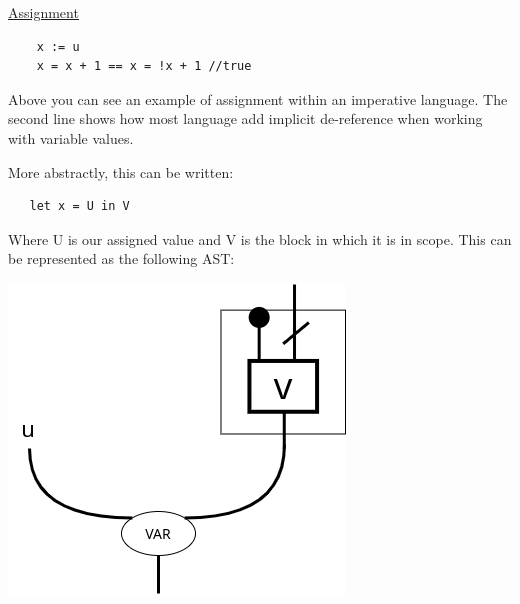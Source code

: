 \documentclass{article}
\renewcommand{\u}[1]{\underline{#1}}
\begin{document}
\u{Assignment}

\begin{verbatim}
    x := u
    x = x + 1 == x = !x + 1 //true
\end{verbatim}

Above you can see an example of assignment within an imperative language. The second line shows how most language add implicit de-reference when working with variable values.

More abstractly, this can be written: 

\begin{verbatim}
   let x = U in V 
\end{verbatim}

Where U is our assigned value and V is the block in which it is in scope.
This can be represented as the following AST:

\begin{center}
\end{center}

\begin{center}
\end{center}

\begin{center}
    \includegraphics[width=0.2\linewidth]{VarAST.png}
\end{center}
\end{document}
